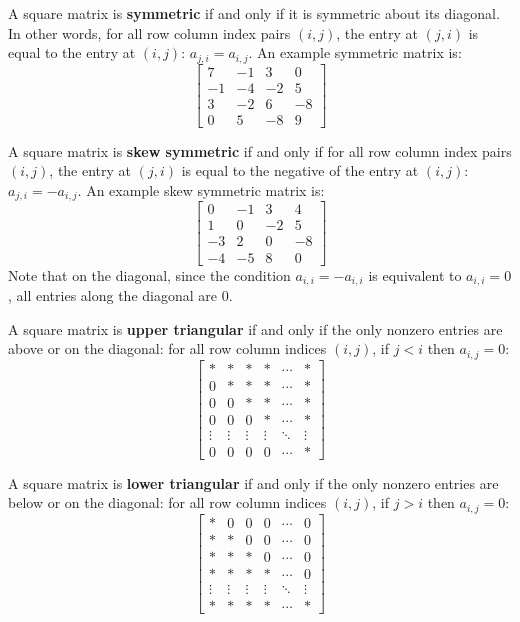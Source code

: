 \documentclass{article}
\begin{document}
A square matrix is {\bf symmetric} if and only if it is symmetric about its diagonal. In other words, for all row column index pairs \((i,j)\), the entry at \((j,i)\) is equal to the entry at \((i,j)\): \(a_{j,i} = a_{i,j}\). An example symmetric matrix is:
\[\begin{bmatrix}
7 & -1 & 3 & 0 \\
-1 & -4 & -2 & 5 \\
3 & -2 & 6 & -8 \\ 
0 & 5 & -8 & 9
\end{bmatrix}\]

A square matrix is {\bf skew symmetric} if and only if for all row column index pairs \((i,j)\), the entry at \((j,i)\) is equal to the negative of the entry at \((i,j)\): \(a_{j,i} = -a_{i,j}\). An example skew symmetric matrix is:
\[\begin{bmatrix}
0 & -1 & 3 & 4 \\
1 & 0 & -2 & 5 \\
-3 & 2 & 0 & -8 \\ 
-4 & -5 & 8 & 0
\end{bmatrix}\]
Note that on the diagonal, since the condition \(a_{i,i} = -a_{i,i}\) is equivalent to \(a_{i,i} = 0\), all entries along the diagonal are \(0\).

\vspace{5mm}

A square matrix is {\bf upper triangular} if and only if the only nonzero entries are above or on the diagonal: for all row column indices \((i, j)\), if \(j < i\) then \(a_{i,j} = 0\):  
\[\begin{bmatrix}
* & * & * & * & \cdots & * \\
0 & * & * & * & \cdots & * \\
0 & 0 & * & * & \cdots & * \\
0 & 0 & 0 & * & \cdots & * \\
\vdots & \vdots & \vdots & \vdots & \ddots & \vdots \\
0 & 0 & 0 & 0 & \cdots & *
\end{bmatrix}\]

A square matrix is {\bf lower triangular} if and only if the only nonzero entries are below or on the diagonal: for all row column indices \((i, j)\), if \(j > i\) then \(a_{i,j} = 0\):  
\[\begin{bmatrix}
* & 0 & 0 & 0 & \cdots & 0 \\
* & * & 0 & 0 & \cdots & 0 \\
* & * & * & 0 & \cdots & 0 \\
* & * & * & * & \cdots & 0 \\
\vdots & \vdots & \vdots & \vdots & \ddots & \vdots \\
* & * & * & * & \cdots & *
\end{bmatrix}\]
\end{document}
